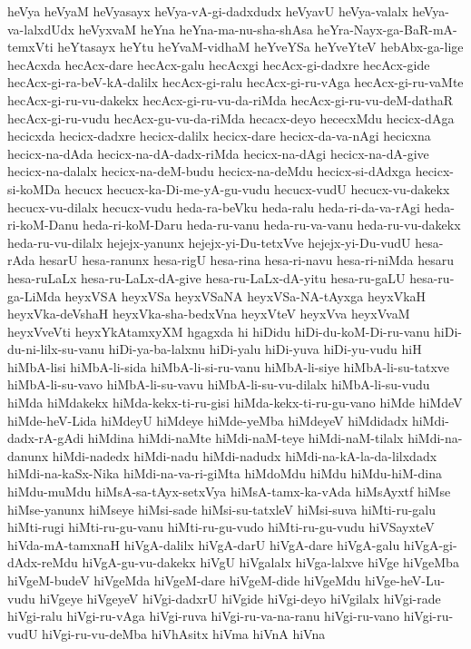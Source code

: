 {heVya
heVyaM
heVyasayx
heVya-vA-gi-dadxdudx
heVyavU
heVya-valalx
heVya-va-lalxdUdx
heVyxvaM
heYna
heYna-ma-nu-sha-shAsa
heYra-Nayx-ga-BaR-mA-temxVti
heYtasayx
heYtu
heYvaM-vidhaM
heYveYSa
heYveYteV
hebAbx-ga-lige
hecAcxda
hecAcx-dare
hecAcx-galu
hecAcxgi
hecAcx-gi-dadxre
hecAcx-gide
hecAcx-gi-ra-beV-kA-dalilx
hecAcx-gi-ralu
hecAcx-gi-ru-vAga
hecAcx-gi-ru-vaMte
hecAcx-gi-ru-vu-dakekx
hecAcx-gi-ru-vu-da-riMda
hecAcx-gi-ru-vu-deM-dathaR
hecAcx-gi-ru-vudu
hecAcx-gu-vu-da-riMda
hecacx-deyo
hececxMdu
hecicx-dAga
hecicxda
hecicx-dadxre
hecicx-dalilx
hecicx-dare
hecicx-da-va-nAgi
hecicxna
hecicx-na-dAda
hecicx-na-dA-dadx-riMda
hecicx-na-dAgi
hecicx-na-dA-give
hecicx-na-dalalx
hecicx-na-deM-budu
hecicx-na-deMdu
hecicx-si-dAdxga
hecicx-si-koMDa
hecucx
hecucx-ka-Di-me-yA-gu-vudu
hecucx-vudU
hecucx-vu-dakekx
hecucx-vu-dilalx
hecucx-vudu
heda-ra-beVku
heda-ralu
heda-ri-da-va-rAgi
heda-ri-koM-Danu
heda-ri-koM-Daru
heda-ru-vanu
heda-ru-va-vanu
heda-ru-vu-dakekx
heda-ru-vu-dilalx
hejejx-yanunx
hejejx-yi-Du-tetxVve
hejejx-yi-Du-vudU
hesa-rAda
hesarU
hesa-ranunx
hesa-rigU
hesa-rina
hesa-ri-navu
hesa-ri-niMda
hesaru
hesa-ruLaLx
hesa-ru-LaLx-dA-give
hesa-ru-LaLx-dA-yitu
hesa-ru-gaLU
hesa-ru-ga-LiMda
heyxVSA
heyxVSa
heyxVSaNA
heyxVSa-NA-tAyxga
heyxVkaH
heyxVka-deVshaH
heyxVka-sha-bedxVna
heyxVteV
heyxVva
heyxVvaM
heyxVveVti
heyxYkAtamxyXM
hgagxda
hi
hiDidu
hiDi-du-koM-Di-ru-vanu
hiDi-du-ni-lilx-su-vanu
hiDi-ya-ba-lalxnu
hiDi-yalu
hiDi-yuva
hiDi-yu-vudu
hiH
hiMbA-lisi
hiMbA-li-sida
hiMbA-li-si-ru-vanu
hiMbA-li-siye
hiMbA-li-su-tatxve
hiMbA-li-su-vavo
hiMbA-li-su-vavu
hiMbA-li-su-vu-dilalx
hiMbA-li-su-vudu
hiMda
hiMdakekx
hiMda-kekx-ti-ru-gisi
hiMda-kekx-ti-ru-gu-vano
hiMde
hiMdeV
hiMde-heV-Lida
hiMdeyU
hiMdeye
hiMde-yeMba
hiMdeyeV
hiMdidadx
hiMdi-dadx-rA-gAdi
hiMdina
hiMdi-naMte
hiMdi-naM-teye
hiMdi-naM-tilalx
hiMdi-na-danunx
hiMdi-nadedx
hiMdi-nadu
hiMdi-nadudx
hiMdi-na-kA-la-da-lilxdadx
hiMdi-na-kaSx-Nika
hiMdi-na-va-ri-giMta
hiMdoMdu
hiMdu
hiMdu-hiM-dina
hiMdu-muMdu
hiMsA-sa-tAyx-setxVya
hiMsA-tamx-ka-vAda
hiMsAyxtf
hiMse
hiMse-yanunx
hiMseye
hiMsi-sade
hiMsi-su-tatxleV
hiMsi-suva
hiMti-ru-galu
hiMti-rugi
hiMti-ru-gu-vanu
hiMti-ru-gu-vudo
hiMti-ru-gu-vudu
hiVSayxteV
hiVda-mA-tamxnaH
hiVgA-dalilx
hiVgA-darU
hiVgA-dare
hiVgA-galu
hiVgA-gi-dAdx-reMdu
hiVgA-gu-vu-dakekx
hiVgU
hiVgalalx
hiVga-lalxve
hiVge
hiVgeMba
hiVgeM-budeV
hiVgeMda
hiVgeM-dare
hiVgeM-dide
hiVgeMdu
hiVge-heV-Lu-vudu
hiVgeye
hiVgeyeV
hiVgi-dadxrU
hiVgide
hiVgi-deyo
hiVgilalx
hiVgi-rade
hiVgi-ralu
hiVgi-ru-vAga
hiVgi-ruva
hiVgi-ru-va-na-ranu
hiVgi-ru-vano
hiVgi-ru-vudU
hiVgi-ru-vu-deMba
hiVhAsitx
hiVma
hiVnA
hiVna
}
